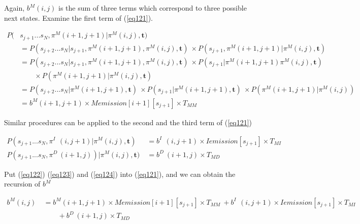 \documentclass[10pt]{article}
\begin{document}
    Again, $b^{M}(i, j)$ is the sum of three terms which correspond to three possible next states. Examine the first term of (\ref{eq121}).

    \begin{equation} \label{eq122}
    \begin{aligned}
      P(&s_{j+1}...s_N, \pi^M(i+1, j+1) | \pi^M(i, j), \mathbf{t}) \\
        &= P(s_{j+2}...s_N | s_{j+1}, \pi^M(i+1, j+1), \pi^M(i, j), \mathbf{t}) \
          \times P(s_{j+1}, \pi^M(i+1, j+1) | \pi^M(i, j), \mathbf{t}) \\
        &= P(s_{j+2}...s_N | s_{j+1}, \pi^M(i+1, j+1), \pi^M(i, j), \mathbf{t}) \
          \times P(s_{j+1} | \pi^M(i+1, j+1) \pi^M(i, j), \mathbf{t}) \\
          &\qquad\times P(\pi^M(i+1, j+1) | \pi^M(i, j), \mathbf{t}) \\
        &= P(s_{j+2}...s_N | \pi^M(i+1, j+1), \mathbf{t}) \
          \times P(s_{j+1} | \pi^M(i+1, j+1), \mathbf{t}) \
          \times P(\pi^M(i+1, j+1) | \pi^M(i, j)) \\
        &= b^M(i+1, j+1) \times Memission[i+1][s_{j+1}] \times T_{MM}
    \end{aligned}
    \end{equation}

    Similar procedures can be applied to the second and the third term of (\ref{eq121})

    \begin{align}
      P(s_{j+1}...s_N, \pi^{I\;\;}(i, j+1) | \pi^M(i, j), \mathbf{t}) \
        &= b^{I\;\;}(i, j+1) \times Iemission[s_{j+1}] \times T_{MI} \label{eq123}\\
      P(s_{j+1}...s_N, \pi^{D\;}(i+1, j)) | \pi^M(i, j), \mathbf{t}) \
        &= b^{D\;}(i+1, j) \times T_{MD} \label{eq124}
    \end{align}

    Put (\ref{eq122}) (\ref{eq123}) and (\ref{eq124}) into (\ref{eq121}), and we can obtain the recursion of $b^{M}$

    \begin{equation}
    \begin{aligned}
      b^M(i, j) \
        &= b^M(i+1, j+1) \times Memission[i+1][s_{j+1}] \times T_{MM} \
          + b^{I\;\;}(i, j+1) \times Iemission[s_{j+1}] \times T_{MI} \\
          &\qquad+ b^{D\;}(i+1, j) \times T_{MD}
    \end{aligned}
    \end{equation}
\end{document}

